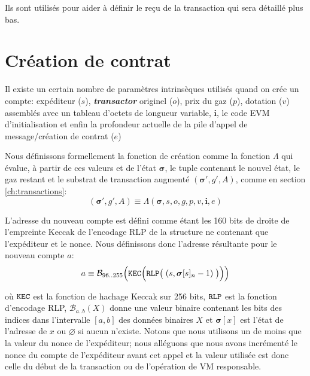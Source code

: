\documentclass[9pt,oneside]{amsart}
\begin{document}
\begin{multicols}{2}
Ils sont utilisés pour aider à définir le reçu de la transaction qui sera détaillé plus bas.


\section{Création de contrat} \label{ch:create}

Il existe un certain nombre de paramètres intrinsèques utilisés quand on crée un compte: expéditeur ($s$), \textbf{\textit{transactor}} originel ($o$), prix du gaz ($p$), dotation ($v$) assemblés avec un tableau d'octets de longueur variable, $\mathbf{i}$, le code EVM d'initialisation et enfin la profondeur actuelle de la pile d'appel de message/création de contrat ($e$)

Nous définissons formellement la fonction de création comme la fonction $\Lambda$ qui évalue, à partir de ces valeurs et de l'état $\boldsymbol{\sigma}$, le tuple contenant le nouvel état, le gaz restant et le substrat de transaction augmenté $(\boldsymbol{\sigma}', g', A)$, comme en section  \ref{ch:transactions}:
\begin{equation}
(\boldsymbol{\sigma}', g', A) \equiv \Lambda(\boldsymbol{\sigma}, s, o, g, p, v, \mathbf{i}, e)
\end{equation}

L'adresse du nouveau compte est défini comme étant les 160 bits de droite de l'empreinte Keccak de l'encodage RLP de la structure ne contenant que l'expéditeur et le nonce. Nous définissons donc l'adresse résultante pour le nouveau compte $a$:
\begin{equation}
a \equiv \mathcal{B}_{96..255}\Big(\mathtt{\tiny KEC}\Big(\mathtt{\tiny RLP}\big(\;(s, \boldsymbol{\sigma}[s]_n - 1)\;\big)\Big)\Big)
\end{equation}

où $\mathtt{\tiny KEC}$ est la fonction de hachage Keccak sur 256 bits, $\mathtt{\tiny RLP}$ est la fonction d'encodage RLP, $\mathcal{B}_{a..b}(X)$ donne une valeur binaire contenant les bits des indices dans l'intervalle $[a, b]$ des données binaires $X$ et $\boldsymbol{\sigma}[x]$ est l'état de l'adresse de $x$ ou $\varnothing$ si aucun n'existe. Notons que nous utilisons un de moins que la valeur du nonce de l'expéditeur; nous alléguons que nous avons incrémenté le nonce du compte de l'expéditeur avant cet appel et la valeur utilisée est donc celle du début de la transaction ou de l'opération de VM responsable.


\end{multicols}
\end{document}

